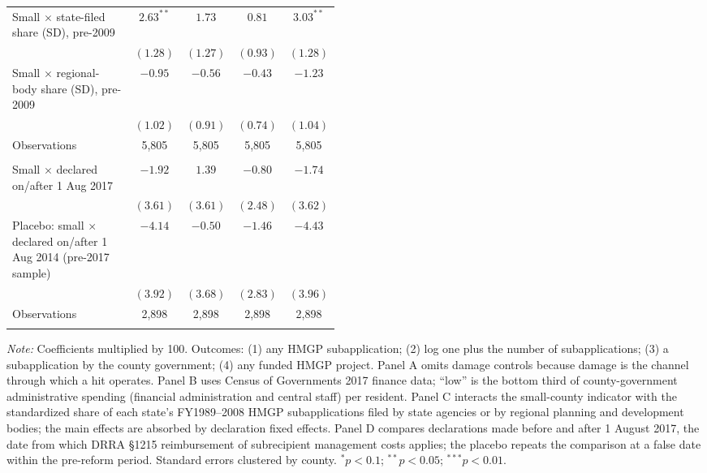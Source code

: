 \begin{table}[!htbp]
\begin{adjustbox}{max width=\linewidth}
\begin{tabular}{@{}p{0.47\linewidth}cccc@{}}
Small $\times$ state-filed share (SD), pre-2009 & $2.63^{**}$ & $1.73$ & $0.81$ & $3.03^{**}$ \\
 & $(1.28)$ & $(1.27)$ & $(0.93)$ & $(1.28)$ \\
Small $\times$ regional-body share (SD), pre-2009 & $-0.95$ & $-0.56$ & $-0.43$ & $-1.23$ \\
 & $(1.02)$ & $(0.91)$ & $(0.74)$ & $(1.04)$ \\
\quad Observations & 5,805 & 5,805 & 5,805 & 5,805 \\
\addlinespace
\multicolumn{5}{l}{\textit{Panel D. Management-cost reimbursement, DRRA \S1215 (county and declaration fixed effects)}} \\
Small $\times$ declared on/after 1 Aug 2017 & $-1.92$ & $1.39$ & $-0.80$ & $-1.74$ \\
 & $(3.61)$ & $(3.61)$ & $(2.48)$ & $(3.62)$ \\
Placebo: small $\times$ declared on/after 1 Aug 2014 (pre-2017 sample) & $-4.14$ & $-0.50$ & $-1.46$ & $-4.43$ \\
 & $(3.92)$ & $(3.68)$ & $(2.83)$ & $(3.96)$ \\
\quad Observations & 2,898 & 2,898 & 2,898 & 2,898 \\
\addlinespace
\bottomrule
\end{tabular}
\end{adjustbox}
\begin{minipage}{0.95\linewidth}\vspace{4pt}\scriptsize
\textit{Note:} Coefficients multiplied by 100. Outcomes: (1) any HMGP subapplication; (2) log one plus the number of subapplications; (3) a subapplication by the county government; (4) any funded HMGP project. Panel A omits damage controls because damage is the channel through which a hit operates. Panel B uses Census of Governments 2017 finance data; ``low'' is the bottom third of county-government administrative spending (financial administration and central staff) per resident. Panel C interacts the small-county indicator with the standardized share of each state's FY1989--2008 HMGP subapplications filed by state agencies or by regional planning and development bodies; the main effects are absorbed by declaration fixed effects. Panel D compares declarations made before and after 1 August 2017, the date from which DRRA \S1215 reimbursement of subrecipient management costs applies; the placebo repeats the comparison at a false date within the pre-reform period. Standard errors clustered by county. $^{*}p<0.1$; $^{**}p<0.05$; $^{***}p<0.01$.
\end{minipage}
\end{table}
